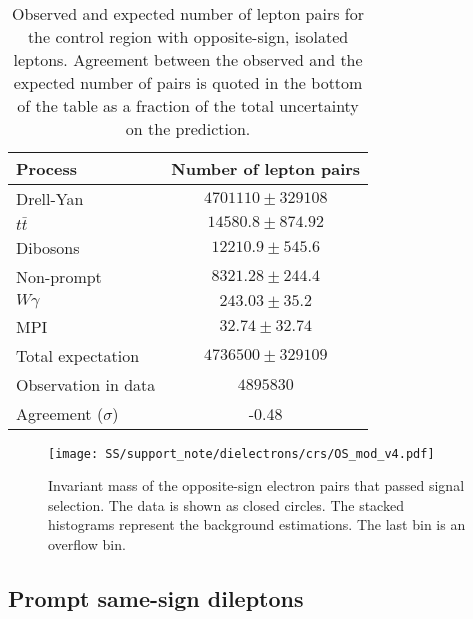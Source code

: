 \begin{table}[htbp]
\begin{center}
\begin{tabular}{l|c}

Process & Number of lepton pairs \\\hline\hline
        Drell-Yan	& $ 4701110 \pm 329108 $	\\[+0.05in]
	$t\bar{t}$	& $ 14580.8 \pm 874.92 $	\\[+0.05in]
	Dibosons	& $ 12210.9 \pm 545.6 $	\\[+0.05in]
	Non-prompt	& $ 8321.28 \pm 244.4 $	\\[+0.05in]
	$W\gamma$	& $ 243.03 \pm 35.2 $	\\[+0.05in]
	MPI	& $ 32.74 \pm 32.74 $	\\[+0.05in]
	\hline
	Total expectation	& $ 4736500 \pm 329109 $	\\[+0.05in]
	\hline
	Observation in data	& $ 4895830 $	\\[+0.05in]
	\hline
	Agreement ($\sigma$) & -0.48 \\[+0.05in]

\hline  
\end{tabular}
\end{center}
\caption{Observed and expected number of lepton pairs for the control region with opposite-sign, isolated leptons.
Agreement between the observed and the expected number of pairs is quoted in the bottom of the table as a fraction of the total uncertainty on the prediction.
} %
\label{tab:dilep_isoOS}
\end{table}

\begin{figure}[h]
\begin{center}
\texttt{[image: SS/support\_note/dielectrons/crs/OS\_mod\_v4.pdf]}
\caption{Invariant mass of the opposite-sign electron pairs that passed signal selection.
The data is shown as closed circles. The stacked histograms represent the background estimations. 
The last bin is an overflow bin.
}
\label{fig:OS_CR}
\end{center}
\end{figure} 

\subsection{Prompt same-sign dileptons}

